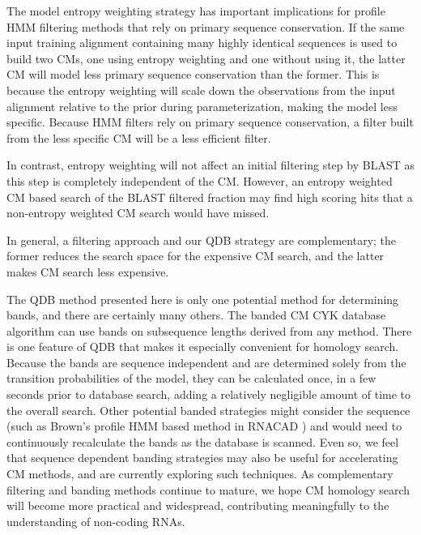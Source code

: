 \documentclass[11pt]{article}
\begin{document}

The model entropy weighting strategy has important implications for
profile HMM filtering methods that rely on primary sequence
conservation. If the same input training alignment containing many
highly identical sequences is used to build two CMs, one using entropy
weighting and one without using it, the latter CM will model less
primary sequence conservation than the former. 
This is because the entropy weighting will scale down the observations from
the input alignment relative to the prior during parameterization,
making the model less specific.  Because HMM filters rely on primary
sequence conservation, a filter built from the less specific CM
will be a less efficient filter.

In contrast, entropy weighting will not affect an
initial filtering step by \textsc{BLAST} as this step is completely
independent of the CM. However, an entropy weighted CM
based search of the \textsc{BLAST} filtered fraction may find high
scoring hits that a non-entropy weighted CM search would have
missed. 


In general, a filtering approach and our QDB strategy are
complementary; the former reduces the search space for the expensive
CM search, and the latter makes CM search less expensive.

The QDB method presented here is only one potential
method for determining bands, and there are certainly many others. 
The banded CM CYK database algorithm can use bands on subsequence
lengths derived from any method.
There is one feature of QDB that makes it especially convenient for
homology search. Because the bands are sequence independent and are
determined solely from the transition probabilities of the model, they
can be calculated once, in a few seconds prior to database search, 
adding a relatively negligible amount of time to the overall search.
Other potential banded strategies might consider the sequence
(such as Brown's profile HMM based method in \textsc{RNACAD}
\cite{Brown00}) and would need to continuously recalculate the bands as
the database is scanned. Even so, we feel that sequence dependent
banding strategies may also be useful for accelerating CM methods, and
are currently exploring such techniques. 
As complementary filtering and banding methods continue to mature, we
hope CM homology search will become more practical and widespread,
contributing meaningfully to the understanding of non-coding RNAs.
\end{document}
